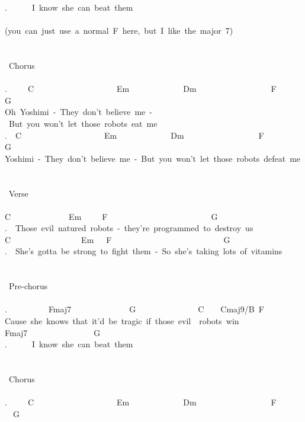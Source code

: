 {.\ \ \ \ \ \ I\ know\ she\ can\ beat\ them\\
\\
(you\ can\ just\ use\ a\ normal\ F\ here,\ but\ I\ like\ the\ major\ 7)\\
\\
\\
\lbrack\ Chorus\rbrack\\
\\
.\ \ \ \ \ C\ \ \ \ \ \ \ \ \ \ \ \ \ \ \ \ \ \ \ \ Em\ \ \ \ \ \ \ \ \ \ \ \ \ Dm\ \ \ \ \ \ \ \ \ \ \ \ \ \ \ \ \ \ F\ \ \ \ \ \ G\\
Oh\ Yoshimi\ -\ They\ don't\ believe\ me\ -\ But\ you\ won't\ let\ those\ robots\ eat\ me\\
.\ \ C\ \ \ \ \ \ \ \ \ \ \ \ \ \ \ \ \ \ \ \ Em\ \ \ \ \ \ \ \ \ \ \ \ \ Dm\ \ \ \ \ \ \ \ \ \ \ \ \ \ \ \ \ \ F\ \ \ \ \ \ \ \ G\\
Yoshimi\ -\ They\ don't\ believe\ me\ -\ But\ you\ won't\ let\ those\ robots\ defeat\ me\\
\\
\\
\lbrack\ Verse\rbrack\\
\\
C\ \ \ \ \ \ \ \ \ \ \ \ \ \ Em\ \ \ \ \ F\ \ \ \ \ \ \ \ \ \ \ \ \ \ \ \ \ \ \ \ \ \ \ \ \ G\\
.\ \ Those\ evil\ natured\ robots\ -\ they're\ programmed\ to\ destroy\ us\\
C\ \ \ \ \ \ \ \ \ \ \ \ \ \ \ \ \ Em\ \ \ F\ \ \ \ \ \ \ \ \ \ \ \ \ \ \ \ \ \ \ \ \ \ \ \ \ \ \ G\\
.\ \ She's\ gotta\ be\ strong\ to\ fight\ them\ -\ So\ she's\ taking\ lots\ of\ vitamins\\
\\
\\
\lbrack\ Pre-chorus\rbrack\\
\\
.\ \ \ \ \ \ \ \ \ \ Fmaj7\ \ \ \ \ \ \ \ \ \ \ \ \ \ G\ \ \ \ \ \ \ \ \ \ \ \ \ \ \ C\ \ \ \ Cmaj9/B\ F\\
Cause\ she\ knows\ that\ it'd\ be\ tragic\ if\ those\ evil\ \ robots\ win\\
Fmaj7\ \ \ \ \ \ \ \ \ \ \ \ \ \ \ \ G\\
.\ \ \ \ \ \ I\ know\ she\ can\ beat\ them\\
\\
\\
\lbrack\ Chorus\rbrack\\
\\
.\ \ \ \ \ C\ \ \ \ \ \ \ \ \ \ \ \ \ \ \ \ \ \ \ \ Em\ \ \ \ \ \ \ \ \ \ \ \ \ Dm\ \ \ \ \ \ \ \ \ \ \ \ \ \ \ \ \ \ F\ \ \ \ \ \ \ \ G\\
}
